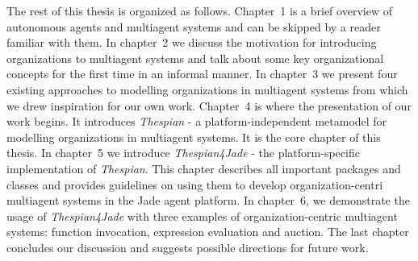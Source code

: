 The rest of this thesis is organized as follows.
Chapter~1 is a brief overview of autonomous agents and multiagent systems and can be skipped by a reader familiar with them.
In chapter~2 we discuss the motivation for introducing organizations to multiagent systems and talk about some key organizational concepts for the first time in an informal manner.
In chapter~3 we present four existing approaches to modelling organizations in multiagent systems from which we drew inspiration for our own work.
Chapter~4 is where the presentation of our work begins. It introduces \textit{Thespian} - a platform-independent metamodel for modelling organizations in multiagent systems. It is the core chapter of this thesis.
In chapter~5 we introduce \textit{Thespian4Jade} - the platform-specific implementation of \textit{Thespian}. This chapter describes all important packages and classes and provides guidelines on using them to develop organization-centri multiagent systems in the Jade agent platform.
In chapter~6, we demonstrate the usage of \textit{Thespian4Jade} with three examples of organization-centric multiagent systems: function invocation, expression evaluation and auction.
The last chapter concludes our discussion and suggests possible directions for future work.